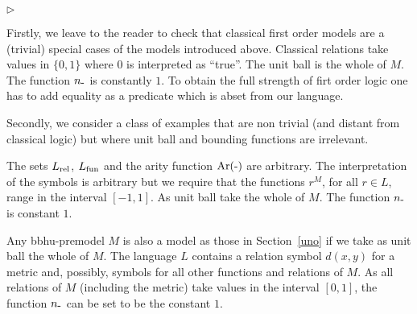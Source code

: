 \documentclass[12pt,letterpaper,oneside,reqno]{amsart}
\newcommand{\mylabel}[1]{{#1}\hfill}
\renewenvironment{itemize}
  {\begin{list}{$\triangleright$}{%
   \setlength{\parskip}{0mm}
   \setlength{\topsep}{.2\baselineskip}
   \setlength{\rightmargin}{0mm}
   \setlength{\listparindent}{0mm}
   \setlength{\itemindent}{0mm}
   \setlength{\labelwidth}{3ex}
   \setlength{\itemsep}{.2\baselineskip}
   \setlength{\parsep}{.2\baselineskip}
   \setlength{\partopsep}{0mm}
   \setlength{\labelsep}{1ex}
   \setlength{\leftmargin}{\labelwidth+\labelsep}
   \let\makelabel\mylabel}}{%
   \end{list}}
\theoremstyle{plain}
\theoremstyle{remark}
\begin{document}
\begin{itemize}
  \item [1.] Firstly, we leave to the reader to check that classical first order models are a (trivial) special cases of the models introduced above.
  Classical relations take values in $\{0,1\}$ where $0$ is interpreted as ``true''.
  The unit ball is the whole of $M$. 
  The function $n_{\mbox-}$ is constantly $1$.
  To obtain the full strength of firt order logic one has to add equality as a predicate which is abset from our language.

  \item [2.] Secondly, we consider a class of examples that are non trivial (and distant from classical logic) but where unit ball and bounding functions are irrelevant.
  
  The sets $L_{\rm rel}$, $L_{\rm fun}$ and the arity function ${\rm Ar}(\mbox-)$ are arbitrary.
  The interpretation of the symbols is arbitrary but we require that the functions $r^M$, for all $r\in L$, range in the interval $[-1,1]$.
  As unit ball take the whole of $M$.
  The function $n_{\mbox-}$ is constant $1$.

  \item [3.] Any {\sc bbhu}-premodel $M$ is also a model as those in Section~\ref{uno} if we take as unit ball the whole of $M$.
  The language $L$ contains a relation symbol $d(x,y)$ for a metric and, possibly, symbols for all other functions and relations of $M$.
  As all relations of $M$ (including the metric) take values in the interval $[0,1]$, the function $n_{\mbox-}$ can be set to be the constant $1$.
  

  

\end{itemize}
\end{document}
